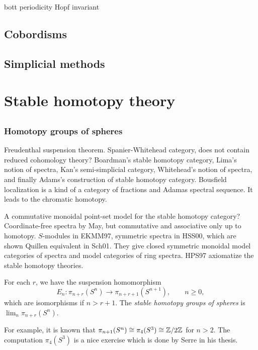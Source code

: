 \documentclass{../../large}
\begin{document}
bott periodicity
Hopf invariant


\chapter{Cobordisms}



\chapter{Simplicial methods}







\part{Stable homotopy theory}


\chapter{}
\section{Homotopy groups of spheres}

Freudenthal suspension theorem.
Spanier-Whitehead category, does not contain reduced cohomology theory?
Boardman's stable homotopy category, Lima's notion of spectra, Kan's semi-simplicial category, Whitehead's notion of spectra, and finally Adams's construction of stable homotopy category.
Bousfield localization is a kind of a category of fractions and Adamas spectral sequence.
It leads to the chromatic homotopy.

A commutative monoidal point-set model for the stable homotopy category?
Coordinate-free spectra by May, but commutative and associative only up to homotopy.
$S$-modules in EKMM97, symmetric spectra in HSS00, which are shown Quillen equivalent in Sch01.
They give closed symmetric monoidal model categories of spectra and model categories of ring spectra.
HPS97 axiomatize the stable homotopy theories.



\begin{prb}
For each $r$, we have the suspension homomorphism
\[E_n:\pi_{n+r}(S^n)\to\pi_{n+r+1}(S^{n+1}),\qquad n\ge0,\]
which are isomorphisms if $n>r+1$.
The \emph{stable homotopy groups of spheres} is $\lim_n\pi_{n+r}(S^n)$.

For example, it is known that $\pi_{n+1}(S^n)\cong\pi_4(S^3)\cong\mathbb{Z}/2\mathbb{Z}$ for $n>2$.
The computation $\pi_4(S^3)$ is a nice exercise which is done by Serre in his thesis.
\end{prb}
\end{document}
